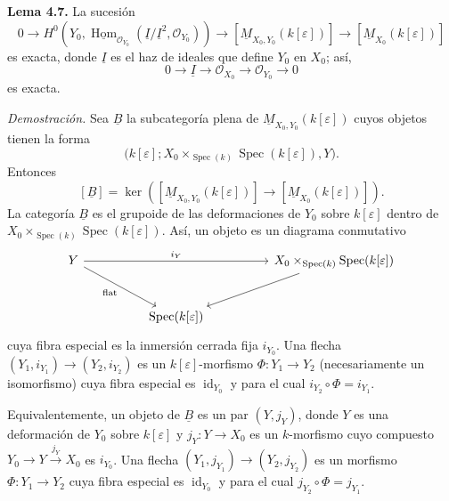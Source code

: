 
\medskip
\noindent\textbf{Lema 4.7.}
La sucesión
\[
0\longrightarrow
H^0\!\left(
Y_0,
\underline{\operatorname{Hom}}_{\mathcal O_{Y_0}}
(\underline I/\underline I^2,\mathcal O_{Y_0})
\right)
\longrightarrow[\underline M_{X_0,Y_0}(k[\varepsilon])]
\longrightarrow[\underline M_{X_0}(k[\varepsilon])]
\]
es exacta, donde $\underline I$ es el haz de ideales que define
$Y_0$ en $X_0$; así,
\[
0\longrightarrow\underline I\longrightarrow\mathcal O_{X_0}
\longrightarrow\mathcal O_{Y_0}\longrightarrow0
\]
es exacta.


\medskip
\noindent\textit{Demostración.}
Sea $\underline B$ la subcategoría plena de
$\underline M_{X_0,Y_0}(k[\varepsilon])$ cuyos objetos tienen la
forma
\[
\bigl(k[\varepsilon];
X_0\times_{\operatorname{Spec}(k)}\operatorname{Spec}(k[\varepsilon]),
Y\bigr).
\]
Entonces
\[
[\underline B]
=\ker\!\left(
[\underline M_{X_0,Y_0}(k[\varepsilon])]
\longrightarrow[\underline M_{X_0}(k[\varepsilon])]
\right).
\]
La categoría $\underline B$ es el grupoide de las deformaciones de
$Y_0$ sobre $k[\varepsilon]$ dentro de
$X_0\times_{\operatorname{Spec}(k)}\operatorname{Spec}(k[\varepsilon])$.
Así, un objeto es un diagrama
conmutativo
\[
\begin{tikzcd}[column sep=huge,row sep=large]
Y \arrow[rr,"i_Y"] \arrow[dr,"\mathrm{flat}"']
&& X_0\times_{\operatorname{Spec}(k)}
   \operatorname{Spec}(k[\varepsilon]) \arrow[dl] \\
& \operatorname{Spec}(k[\varepsilon]) &
\end{tikzcd}
\]
cuya fibra especial es la inmersión cerrada fija $i_{Y_0}$. Una
flecha $(Y_1,i_{Y_1})\longrightarrow(Y_2,i_{Y_2})$ es un
$k[\varepsilon]$-morfismo $\Phi:Y_1\longrightarrow Y_2$
(necesariamente un isomorfismo) cuya fibra especial es
$\operatorname{id}_{Y_0}$ y para el cual
$i_{Y_2}\circ\Phi=i_{Y_1}$.

Equivalentemente, un objeto de $\underline B$ es un par $(Y,j_Y)$,
donde $Y$ es una deformación de $Y_0$ sobre $k[\varepsilon]$ y
$j_Y:Y\longrightarrow X_0$ es un $k$-morfismo cuyo compuesto
$Y_0\longrightarrow Y\xrightarrow{j_Y}X_0$ es $i_{Y_0}$. Una flecha
$(Y_1,j_{Y_1})\longrightarrow(Y_2,j_{Y_2})$ es un morfismo
$\Phi:Y_1\longrightarrow Y_2$ cuya fibra especial es
$\operatorname{id}_{Y_0}$ y para el cual
$j_{Y_2}\circ\Phi=j_{Y_1}$.


